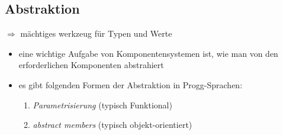 \subsection{Abstraktion}
$\Rightarrow$ mächtiges werkzeug für Typen und Werte


\begin{itemize}
  \item eine wichtige Aufgabe von Komponentensystemen ist, wie man von den
  erforderlichen Komponenten abstrahiert
  \item es gibt folgenden Formen der Abstraktion in Progg-Sprachen:
  \begin{enumerate}
    \item \textit{Parametrisierung} (typisch Funktional)
    \item \textit{abstract members} (typisch objekt-orientiert)
  \end{enumerate}
\end{itemize}




